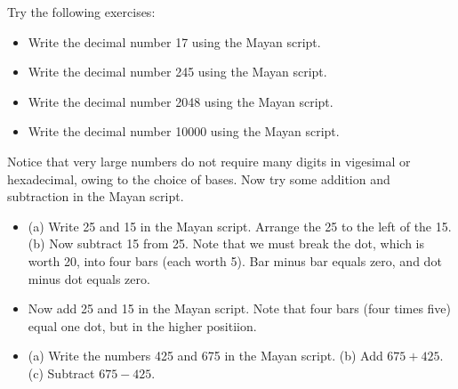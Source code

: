 \documentclass[12pt]{article}
\begin{document}
Try the following exercises:

\begin{itemize}
\item Write the decimal number 17 using the Mayan script. \\ \vspace{2cm}
\item Write the decimal number 245 using the Mayan script. \\ \vspace{2cm}
\item Write the decimal number 2048 using the Mayan script. \\ \vspace{2cm}
\item Write the decimal number 10000 using the Mayan script. \\ \vspace{2cm}
\end{itemize}

\clearpage

Notice that very large numbers do not require many digits in vigesimal or hexadecimal, owing to the choice of bases.  Now try some addition and subtraction in the Mayan script.

\begin{itemize}
\item (a) Write 25 and 15 in the Mayan script.  Arrange the 25 to the left of the 15.  (b) Now subtract 15 from 25. Note that we must break the dot, which is worth 20, into four bars (each worth 5).  Bar minus bar equals zero, and dot minus dot equals zero. \\ \vspace{2cm}
\item Now add 25 and 15 in the Mayan script.  Note that four bars (four times five) equal one dot, but in the higher positiion. \\ \vspace{2cm}
\item (a) Write the numbers 425 and 675 in the Mayan script.  (b) Add $675 + 425$.  (c) Subtract $675 - 425$.
\end{itemize}
\end{document}
